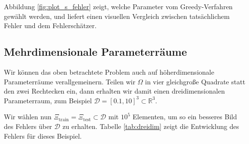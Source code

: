 Abbildung \ref{fig:plot_s_fehler} zeigt, welche Parameter vom Greedy-Verfahren gewählt werden, und liefert einen visuellen Vergleich zwischen tatsächlichem Fehler und dem Fehlerschätzer.

\subsection{Mehrdimensionale Parameterräume} %
\label{sub:mehrdimensionale_parameterr_ume}

Wir können das oben betrachtete Problem auch auf höherdimensionale Parameterräume verallgemeinern. Teilen wir $\Omega$ in vier gleichgroße Quadrate statt den zwei Rechtecken ein, dann erhalten wir damit einen dreidimensionalen Parameterraum, zum Beispiel $\mathcal D = [0.1, 10]^3 \subset \mathbb{R}^3$.

Wir wählen nun $\Xi_\text{train} = \Xi_\text{test} \subset \mathcal D$ mit $10^5$ Elementen, um so ein besseres Bild des Fehlers über $\mathcal D$ zu erhalten. Tabelle \ref{tab:dreidim} zeigt die Entwicklung des Fehlers für dieses Beispiel.

